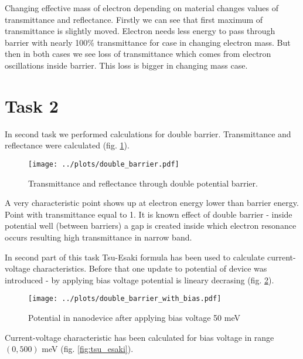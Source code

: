 \documentclass[12pt, a4paper]{article}
\begin{document}
Changing effective mass of electron depending on material changes values of transmittance and reflectance.
Firstly we can see that first maximum of transmittance is slightly moved.
Electron needs less energy to pass through barrier with nearly 100\% transmittance for case in changing electron mass.
But then in both cases we see loss of transmittance which comes from electron oscillations inside barrier.
This loss is bigger in changing mass case.

\newpage

\section*{Task 2}

In second task we performed calculations for double barrier.
Transmittance and reflectance were calculated (fig. \ref{fig:double_barrier}).

\begin{figure}[h]
    \begin{center}
        \texttt{[image: ../plots/double\_barrier.pdf]}
    \end{center}
    \caption{Transmittance and reflectance through double potential barrier.}
    \label{fig:double_barrier}
\end{figure}

A very characteristic point shows up at electron energy lower than barrier energy.
Point with transmittance equal to 1.
It is known effect of double barrier - inside potential well (between barriers) a gap is created inside which electron resonance occurs resulting high transmittance in narrow band.

In second part of this task Tsu-Esaki formula has been used to calculate current-voltage characteristics.
Before that one update to potential of device was introduced - by applying bias voltage potential is lineary decrasing (fig. \ref{fig:bias_voltage}).

\begin{figure}[h]
    \begin{center}
        \texttt{[image: ../plots/double\_barrier\_with\_bias.pdf]}
    \end{center}
    \caption{Potential in nanodevice after applying bias voltage 50 meV}
    \label{fig:bias_voltage}
\end{figure}

Current-voltage characteristic has been calculated for bias voltage in range $(0, 500)$ meV (fig. \ref{fig:tsu_esaki}).
\end{document}
